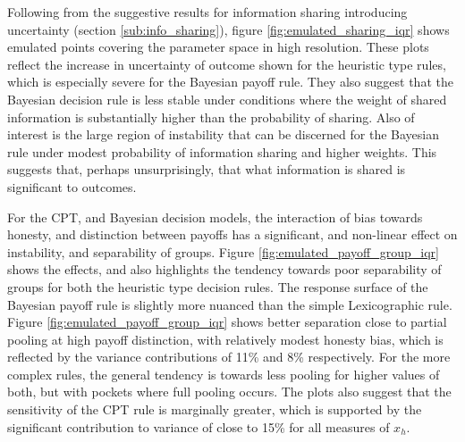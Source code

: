 Following from the suggestive results for information sharing introducing uncertainty (section \ref{sub:info_sharing}), figure \ref{fig:emulated_sharing_iqr} shows emulated points covering the parameter space in high resolution. These plots reflect the increase in uncertainty of outcome shown for the heuristic type rules, which is especially severe for the Bayesian payoff rule. They also suggest that the Bayesian decision rule is less stable under conditions where the weight of shared information is substantially higher than the probability of sharing. Also of interest is the large region of instability that can be discerned for the Bayesian rule under modest probability of information sharing and higher weights. This suggests that, perhaps unsurprisingly, that what information is shared is significant to outcomes.

For the \ac{CPT}, and Bayesian decision models, the interaction of bias towards honesty, and distinction between payoffs has a significant, and non-linear effect on instability, and separability of groups. Figure \ref{fig:emulated_payoff_group_iqr} shows the effects, and also highlights the tendency towards poor separability of groups for both the heuristic type decision rules. The response surface of the Bayesian payoff rule is slightly more nuanced than the simple Lexicographic rule. Figure \ref{fig:emulated_payoff_group_iqr} shows better separation close to partial pooling at high payoff distinction, with relatively modest honesty bias, which is reflected by the variance contributions of 11\% and 8\% respectively.  For the more complex rules, the general tendency is towards less pooling for higher values of both, but with pockets where full pooling occurs.  The plots also suggest that the sensitivity of the \ac{CPT} rule is marginally greater, which is supported by the significant contribution to variance of close to 15\% for all measures of \(x_{h}\).

